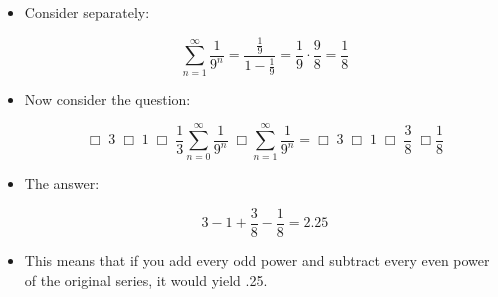 \documentclass[11pt]{article}
\begin{document}
\begin{enumerate}[a)]
\begin{itemize}
	\item Consider separately:
	
	\begin{equation*}
	\sum_{n = 1}^{\infty} \frac{1}{9^n} = \frac{\frac{1}{9}}{1 - \frac{1}{9}} = \frac{1}{9} \cdot \frac{9}{8} = \frac{1}{8}
	\end{equation*}
	
	\item Now consider the question:
	
	\begin{equation*}
	\Box \; 3 \; \Box \; 1 \; \Box \; \frac{1}{3} \sum_{n = 0}^{\infty} \frac{1}{9^n} \; \Box \sum_{n = 1}^{\infty} \frac{1}{9^n} = 
	\Box \; 3 \; \Box \; 1 \; \Box \; \frac{3}{8} \; \Box \frac{1}{8}
	\end{equation*}
	
	\item The answer: 
	
	\begin{equation*}
	3 - 1 + \frac{3}{8} - \frac{1}{8} = 2.25
	\end{equation*}
	
	\item This means that if you add every odd power and subtract every even power of the original series, it would yield .25.
	
\end{itemize}

\end{enumerate}
\end{document}
